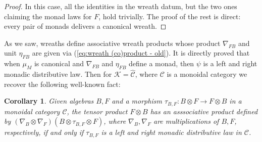 \documentclass[a4paper, 12pt]{article}
\renewcommand{\_}[1]{\mbox{$_{\left( #1 \right)}$}}
\theoremstyle{plain}
\newtheorem{cor}[thm]{Corollary}
\newcommand{\qed}{\hfill\quad\fbox{\rule[0mm]{0,0cm}{0,0mm}}  \par\bigskip}
\newcommand{\ot}{\otimes}
\newcommand{\C}{{\mathcal C}}
\def\K{{\mathcal K}}  %
\newcommand{\equref}[1]{(\ref{eq:#1})}
\begin{document}
\begin{proof}
In this case, all the identities in the wreath datum, but the two ones claiming the monad laws for $F$, hold trivially. The proof of the rest is direct: 
every pair of monads delivers a canonical wreath.  
\qed\end{proof}


As we saw, wreaths define associative wreath products whose product $\nabla_{FB}$ and unit $\eta_{FB}$ are given via \equref{wreath (co)product - old}. 
It is directly proved that when $\mu_M$ is canonical and $\nabla_{FB}$ and $\eta_{FB}$ define a monad, then $\psi$ is a left and right monadic distributive law. 
Then for $\K=\hat\C$, where $\C$ is a monoidal category %
we recover the following well-known fact: 


\begin{cor}
Given algebras $B,F$ and a morphism $\tau_{B,F}: B\ot F\to F\ot B$ in a monoidal category $\C$, 
the tensor product $F\ot B$ has an asssociative product defined by $(\nabla_B\ot\nabla_F)(B\ot\tau_{B,F}\ot F)$, where  
$\nabla_B, \nabla_F$ are multiplications of $B,F$, respectively, if and only if $\tau_{B,F}$ is a left and right monadic distributive law in $\C$. 
\end{cor}
\end{document}
